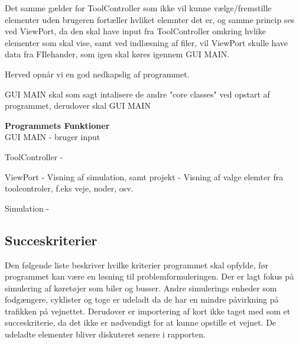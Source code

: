 Det samme gælder for ToolController som ikke vil kunne vælge/fremstille elementer uden brugeren fortæller hvliket elemnter det er, og samme princip ses ved ViewPort, da den skal have input fra ToolController omkring hvlike elementer som skal vise, samt ved indlæsning af filer, vil ViewPort skulle have data fra FIlehander, som igen skal køres igennem GUI MAIN.

Herved opnår vi en god nedkapslig af programmet.

\vspace{5mm}


GUI MAIN skal som sagt intalisere de andre "core classes" ved opstart af programmet, derudover skal GUI MAIN 




\textbf{Programmets Funktioner} \\

GUI MAIN
 - bruger input
 
 
ToolController
 - 
 
 
ViewPort
 - Visning af simulation, samt projekt
 - Visning af valge elemter fra toolcontroler, f.eks veje, noder, osv. 
 
 
 
Simulation
 -  






\vspace{5mm}

\subsection{Succeskriterier}\label{Succeskriterier}
Den følgende liste beskriver hvilke kriterier programmet skal opfylde, før programmet kan være en løsning til problemformuleringen. Der er lagt fokus på simulering af køretøjer som biler og busser. Andre simulerings enheder som fodgængere, cyklister og toge er udeladt da de har en mindre påvirkning på trafikken på vejnettet. Derudover er importering af kort ikke taget med som et succeskriterie, da det ikke er nødvendigt for at kunne opstille et vejnet. De udeladte elementer bliver diskuteret senere i rapporten.

